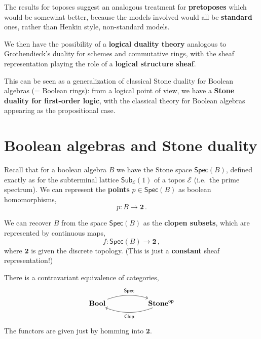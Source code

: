 \documentclass[11pt]{article}
\newcommand{\E}{\ensuremath{\mathcal{E}}}
\theoremstyle{remark}
\theoremstyle{definition}
\newcommand{\myemph}[1]{\textbf{#1}}
\begin{document}
The results for toposes suggest an analogous treatment for \myemph{pretoposes} which would be somewhat better, 
because the models involved would all be \myemph{standard} ones, rather than Henkin style, non-standard models.
\medskip

We then have the possibility of a \myemph{logical duality theory} analogous to Grothendieck's duality for schemes and commutative rings, with  
the sheaf representation playing the role of a \myemph{logical structure sheaf}.
\medskip

This can be seen as a generalization of classical Stone duality for Boolean algebras (= Boolean rings):
from a logical point of view, we have a \myemph{Stone duality for first-order logic}, 
with the classical theory for Boolean algebras appearing as the propositional case.

\section{Boolean algebras and Stone duality}


Recall that for a boolean algebra $B$ we have the Stone space $\mathsf{Spec}(B)$,  defined exactly as for the subterminal lattice $\mathsf{Sub}_{\E}(1)$ of a topos $\E$ (i.e.\ the prime spectrum).  We can represent the \myemph{points} $p\in \mathsf{Spec}(B)$ as boolean homomorphisms,
\[
p : B\to \mathbf{2}\,.
\]

We can recover $B$ from the space $\mathsf{Spec}(B)$ as the \myemph{clopen subsets}, which are represented by continuous maps,
\[
f : \mathsf{Spec}(B)\to \mathbf{2}\,,
\]
where $\mathbf{2}$ is given the discrete topology. (This is just a \myemph{constant} sheaf representation!)



There is a contravariant equivalence of categories,
\[
\xymatrix{ 
\mathbf{Bool}  \ar@/{}^{1pc}/[rr]^{\mathsf{Spec}}     &&  \mathbf{Stone}^{\mathsf{op}}  \ar@/{}^{1pc}/[ll]^{\mathsf{Clop}}  \\
} 
\]
The functors are given just by homming into $\mathbf{2}$.
\medskip
\end{document}
